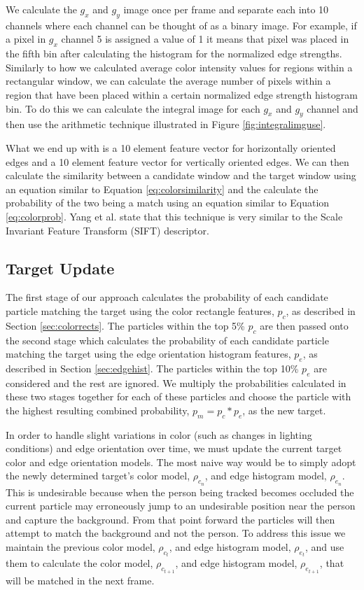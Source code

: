 \documentclass[11pt]{article}
\begin{document}
We calculate the $g_x$ and $g_y$ image once per frame and separate each into 10 channels where each channel can be thought of as a binary image. For example, if a pixel in $g_x$ channel 5 is assigned a value of 1 it means that pixel was placed in the fifth bin after calculating the histogram for the normalized edge strengths. Similarly to how we calculated average color intensity values for regions within a rectangular window, we can calculate the average number of pixels within a region that have been placed within a certain normalized edge strength histogram bin. To do this we can calculate the integral image for each $g_x$ and $g_y$ channel and then use the arithmetic technique illustrated in Figure \ref{fig:integralimguse}. 

What we end up with is a 10 element feature vector for horizontally oriented edges and a 10 element feature vector for vertically oriented edges. We can then calculate the similarity between a candidate window and the target window using an equation similar to Equation \ref{eq:colorsimilarity} and the calculate the probability of the two being a match using an equation similar to Equation \ref{eq:colorprob}. Yang et al. state that this technique is very similar to the Scale Invariant Feature Transform (SIFT) descriptor.


\subsection{Target Update}

The first stage of our approach calculates the probability of each candidate particle matching the target using the color rectangle features, $p_c$, as described in Section \ref{sec:colorrects}. The particles within the top 5\% $p_c$ are then passed onto the second stage which calculates the probability of each candidate particle matching the target using the edge orientation histogram features, $p_e$, as described in Section \ref{sec:edgehist}. The particles within the top 10\% $p_e$ are considered and the rest are ignored. We multiply the probabilities calculated in these two stages together for each of these particles and choose the particle with the highest resulting combined probability, $p_m = p_c * p_e$, as the new target.

In order to handle slight variations in color (such as changes in lighting conditions) and edge orientation over time, we must update the current target color and edge orientation models. The most naive way would be to simply adopt the newly determined target's color model, $\rho_{c_{n}}$, and edge histogram model, $\rho_{e_{n}}$. This is undesirable because when the person being tracked becomes occluded the current particle may erroneously jump to an undesirable position near the person and capture the background. From that point forward the particles will then attempt to match the background and not the person. To address this issue we maintain the previous color model, $\rho_{c_{t}}$, and edge histogram model, $\rho_{e_{t}}$, and use them to calculate the color model, $\rho_{c_{t+1}}$, and edge histogram model, $\rho_{e_{t+1}}$, that will be matched in the next frame.
\end{document}
